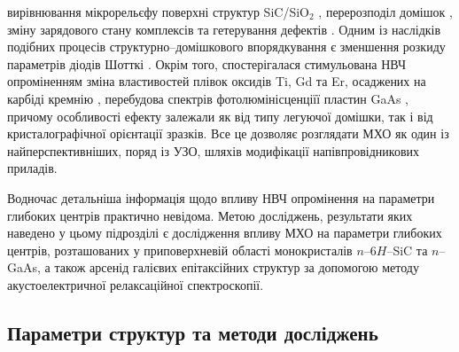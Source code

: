вирівнювання мікрорельєфу поверхні структур SiC/SiO$_2$ \cite{Bacherikov2003r},
перерозподіл домішок \cite{Bacherikov2003r,Belyaev1998JTFr,Konakova2015},
зміну зарядового стану комплексів \cite{Milenin1994}
та гетерування дефектів \cite{Belyaev1998JTFr}.
Одним із наслідків подібних процесів структурно--домішкового впорядкування є зменшення розкиду параметрів діодів Шотткі \cite{Milenin1994,Belyaev1998JTFr}.
Окрім того, спостерігалася стимульована НВЧ опроміненням
зміна властивостей плівок оксидів Ti, Gd та Er, осаджених на карбіді кремнію \cite{Bacherikov2008},
перебудова спектрів фотолюмінісценціїї пластин GaAs \cite{BelyaevIntac,ProcSPIE,Belyaev1998JTFr},
причому особливості ефекту залежали як від типу легуючої домішки, так і від кристалографічної орієнтації зразків.
Все це дозволяє розглядати МХО як один із найперспективніших, поряд із УЗО, шляхів модифікації напівпровідникових приладів.

Водночас детальніша інформація щодо впливу НВЧ опромінення на параметри глибоких центрів практично невідома.
Метою досліджень, результати яких наведено у цьому підрозділі є дослідження впливу МХО на параметри глибоких центрів, розташованих у приповерхневій області монокристалів $n$--6$H$--SiC та $n$--GaAs, а також арсенід галієвих епітаксійних структур за допомогою методу акустоелектричної релаксаційної спектроскопії.



\subsection{Параметри структур та методи досліджень}

